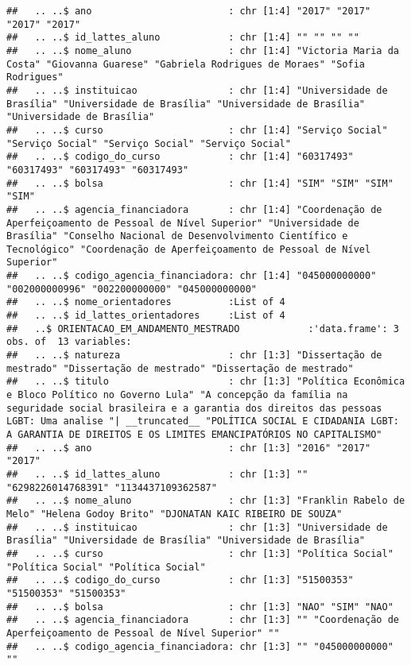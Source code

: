 \documentclass[]{article}
\begin{document}
\begin{verbatim}
##   .. ..$ ano                        : chr [1:4] "2017" "2017" "2017" "2017"
##   .. ..$ id_lattes_aluno            : chr [1:4] "" "" "" ""
##   .. ..$ nome_aluno                 : chr [1:4] "Victoria Maria da Costa" "Giovanna Guarese" "Gabriela Rodrigues de Moraes" "Sofia Rodrigues"
##   .. ..$ instituicao                : chr [1:4] "Universidade de Brasília" "Universidade de Brasília" "Universidade de Brasília" "Universidade de Brasília"
##   .. ..$ curso                      : chr [1:4] "Serviço Social" "Serviço Social" "Serviço Social" "Serviço Social"
##   .. ..$ codigo_do_curso            : chr [1:4] "60317493" "60317493" "60317493" "60317493"
##   .. ..$ bolsa                      : chr [1:4] "SIM" "SIM" "SIM" "SIM"
##   .. ..$ agencia_financiadora       : chr [1:4] "Coordenação de Aperfeiçoamento de Pessoal de Nível Superior" "Universidade de Brasília" "Conselho Nacional de Desenvolvimento Científico e Tecnológico" "Coordenação de Aperfeiçoamento de Pessoal de Nível Superior"
##   .. ..$ codigo_agencia_financiadora: chr [1:4] "045000000000" "002000000996" "002200000000" "045000000000"
##   .. ..$ nome_orientadores          :List of 4
##   .. ..$ id_lattes_orientadores     :List of 4
##   ..$ ORIENTACAO_EM_ANDAMENTO_MESTRADO            :'data.frame': 3 obs. of  13 variables:
##   .. ..$ natureza                   : chr [1:3] "Dissertação de mestrado" "Dissertação de mestrado" "Dissertação de mestrado"
##   .. ..$ titulo                     : chr [1:3] "Política Econômica e Bloco Político no Governo Lula" "A concepção da família na seguridade social brasileira e a garantia dos direitos das pessoas LGBT: Uma analise "| __truncated__ "POLÍTICA SOCIAL E CIDADANIA LGBT: A GARANTIA DE DIREITOS E OS LIMITES EMANCIPATÓRIOS NO CAPITALISMO"
##   .. ..$ ano                        : chr [1:3] "2016" "2017" "2017"
##   .. ..$ id_lattes_aluno            : chr [1:3] "" "6298226014768391" "1134437109362587"
##   .. ..$ nome_aluno                 : chr [1:3] "Franklin Rabelo de Melo" "Helena Godoy Brito" "DJONATAN KAIC RIBEIRO DE SOUZA"
##   .. ..$ instituicao                : chr [1:3] "Universidade de Brasília" "Universidade de Brasília" "Universidade de Brasília"
##   .. ..$ curso                      : chr [1:3] "Política Social" "Política Social" "Política Social"
##   .. ..$ codigo_do_curso            : chr [1:3] "51500353" "51500353" "51500353"
##   .. ..$ bolsa                      : chr [1:3] "NAO" "SIM" "NAO"
##   .. ..$ agencia_financiadora       : chr [1:3] "" "Coordenação de Aperfeiçoamento de Pessoal de Nível Superior" ""
##   .. ..$ codigo_agencia_financiadora: chr [1:3] "" "045000000000" ""

\end{verbatim}
\end{document}
